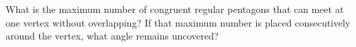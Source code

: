 What is the maximum number of congruent regular pentagons that can meet at one vertex without overlapping? If that maximum number is placed consecutively around the vertex, what angle remains uncovered?
